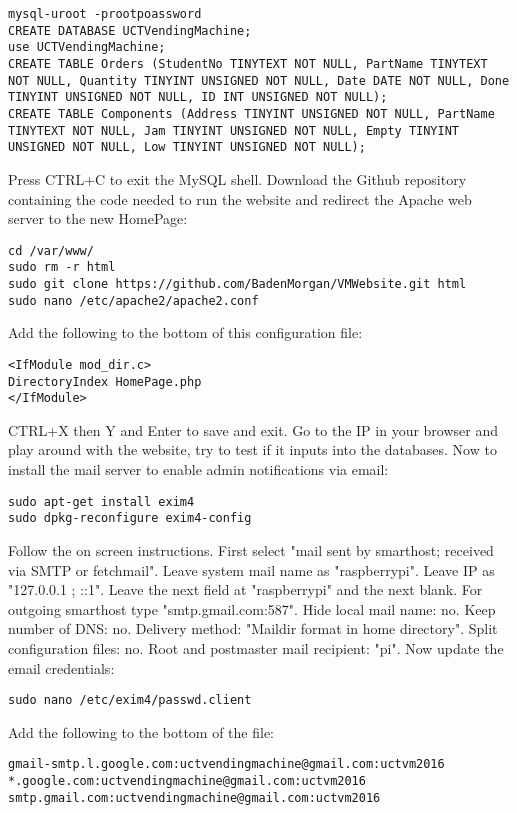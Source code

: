 \documentclass[a4paper,11pt]{article}
\numberwithin{figure}{section}
\numberwithin{table}{section}
\begin{document}
\begin{appendices}
\begin{lstlisting}[firstnumber=11]
mysql-uroot -prootpoassword
CREATE DATABASE UCTVendingMachine;
use UCTVendingMachine;
CREATE TABLE Orders (StudentNo TINYTEXT NOT NULL, PartName TINYTEXT NOT NULL, Quantity TINYINT UNSIGNED NOT NULL, Date DATE NOT NULL, Done TINYINT UNSIGNED NOT NULL, ID INT UNSIGNED NOT NULL);
CREATE TABLE Components (Address TINYINT UNSIGNED NOT NULL, PartName TINYTEXT NOT NULL, Jam TINYINT UNSIGNED NOT NULL, Empty TINYINT UNSIGNED NOT NULL, Low TINYINT UNSIGNED NOT NULL);
\end{lstlisting}
Press CTRL+C to exit the MySQL shell. Download the Github repository containing the code needed to run the website and redirect the Apache web server to the new HomePage:
\begin{lstlisting}[firstnumber=16]
cd /var/www/
sudo rm -r html
sudo git clone https://github.com/BadenMorgan/VMWebsite.git html
sudo nano /etc/apache2/apache2.conf
\end{lstlisting}
Add the following to the bottom of this configuration file:
\begin{lstlisting}[firstnumber=20]
<IfModule mod_dir.c>
DirectoryIndex HomePage.php
</IfModule>
\end{lstlisting}
CTRL+X then Y and Enter to save and exit. Go to the IP in your browser and play around with the website, try to test if it inputs into the databases. Now to install the mail server to enable admin notifications via email:
\begin{lstlisting}[firstnumber=23]
sudo apt-get install exim4
sudo dpkg-reconfigure exim4-config
\end{lstlisting}
Follow the on screen instructions. First select "mail sent by smarthost; received via SMTP or fetchmail". Leave system mail name as "raspberrypi". Leave IP as "127.0.0.1 ; ::1". Leave the next field at "raspberrypi" and the next blank. For outgoing smarthost type "smtp.gmail.com:587". Hide local mail name: no. Keep number of DNS: no. Delivery method: "Maildir format in home directory". Split configuration files: no. Root and postmaster mail recipient: "pi". Now update the email credentials:
\begin{lstlisting}[firstnumber=25]
sudo nano /etc/exim4/passwd.client
\end{lstlisting}
Add the following to the bottom of the file:
\begin{lstlisting}[firstnumber=26]
gmail-smtp.l.google.com:uctvendingmachine@gmail.com:uctvm2016
*.google.com:uctvendingmachine@gmail.com:uctvm2016
smtp.gmail.com:uctvendingmachine@gmail.com:uctvm2016
\end{lstlisting}

\end{appendices}
\end{document}
